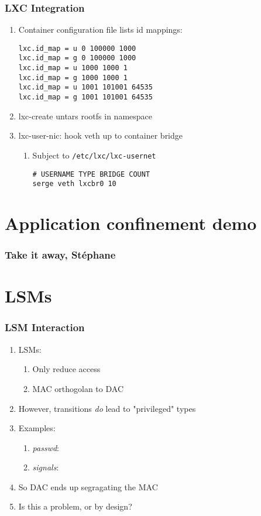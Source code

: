 \documentclass{beamer}
\begin{document}
\begin{frame}[fragile]
\frametitle{LXC Integration}
\begin{enumerate}
\item Container configuration file lists id mappings:
\begin{verbatim}
lxc.id_map = u 0 100000 1000
lxc.id_map = g 0 100000 1000
lxc.id_map = u 1000 1000 1
lxc.id_map = g 1000 1000 1
lxc.id_map = u 1001 101001 64535
lxc.id_map = g 1001 101001 64535
\end{verbatim}
\item lxc-create untars rootfs in namespace
\item lxc-user-nic: hook veth up to container bridge
	\begin{enumerate}
	\item Subject to {\tt /etc/lxc/lxc-usernet}
	\begin{verbatim}
# USERNAME TYPE BRIDGE COUNT
serge veth lxcbr0 10
	\end{verbatim}
	\end{enumerate}
\end{enumerate}
\end{frame}

\section{Application confinement demo}
\begin{frame}
\frametitle{Take it away, Stéphane}
\end{frame}

\section{LSMs}
\begin{frame}
\frametitle{LSM Interaction}
\begin{enumerate}
\item LSMs:
	\begin{enumerate}
	\item Only reduce access
	\item MAC orthogolan to DAC
	\end{enumerate}
\item However, transitions {\em do} lead to "privileged" types
\item Examples:
	\begin{enumerate}
	\item {\em passwd}: 
	\item {\em signals}: 
	\end{enumerate}
\item So DAC ends up segragating the MAC
\item Is this a problem, or by design?
\end{enumerate}
\end{frame}

\end{document}
